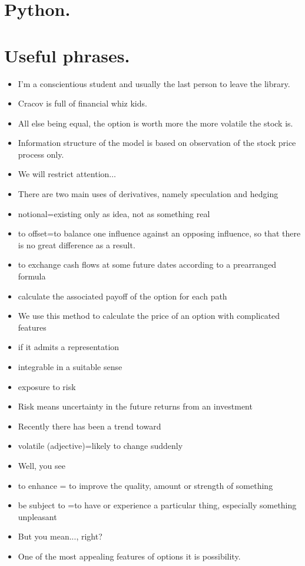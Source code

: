 \documentclass{book}
\begin{document}
\section{Python.}
\section{Useful phrases.}
\begin{itemize}
\item I'm a conscientious student and usually the last person to leave the library.
\item Cracov is full of financial whiz kids.
\item All else being equal, the option is worth more the more volatile the stock is.
\item Information structure of the model is based on observation of the stock price process only.
\item We will restrict attention$\dots$
\item There are two main uses of derivatives, namely speculation and hedging
\item notional=existing only as idea, not as something real 
\item to offset=to balance one influence against an opposing influence, so that there is no great difference as a result.
\item to exchange cash flows at some future dates according to a prearranged formula
\item calculate the associated payoff of the option for each path
\item We use this method to calculate the price of an option with complicated features
\item if it admits a representation
\item integrable in a suitable sense
\item exposure to risk
\item Risk means uncertainty in the future returns from an investment
\item Recently there has been a trend toward
\item volatile (adjective)=likely to change suddenly  
\item Well, you see
\item to enhance = to improve the quality, amount or strength of something 
\item be subject to =to have or experience a particular thing, especially something unpleasant 
\item But you mean..., right?
\item One of the most appealing features of options it is possibility.

\end{itemize}
\end{document}
